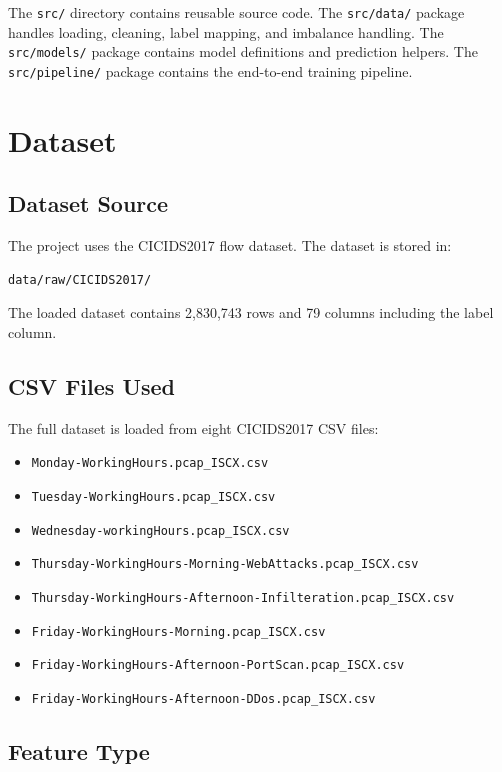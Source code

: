 \documentclass[12pt,a4paper]{article}
\begin{document}
The \texttt{src/} directory contains reusable source code. The \texttt{src/data/} package handles loading, cleaning, label mapping, and imbalance handling. The \texttt{src/models/} package contains model definitions and prediction helpers. The \texttt{src/pipeline/} package contains the end-to-end training pipeline.

\section{Dataset}

\subsection{Dataset Source}

The project uses the CICIDS2017 flow dataset. The dataset is stored in:

\begin{lstlisting}
data/raw/CICIDS2017/
\end{lstlisting}

The loaded dataset contains 2,830,743 rows and 79 columns including the label column.

\subsection{CSV Files Used}

The full dataset is loaded from eight CICIDS2017 CSV files:

\begin{itemize}
    \item \texttt{Monday-WorkingHours.pcap\_ISCX.csv}
    \item \texttt{Tuesday-WorkingHours.pcap\_ISCX.csv}
    \item \texttt{Wednesday-workingHours.pcap\_ISCX.csv}
    \item \texttt{Thursday-WorkingHours-Morning-WebAttacks.pcap\_ISCX.csv}
    \item \texttt{Thursday-WorkingHours-Afternoon-Infilteration.pcap\_ISCX.csv}
    \item \texttt{Friday-WorkingHours-Morning.pcap\_ISCX.csv}
    \item \texttt{Friday-WorkingHours-Afternoon-PortScan.pcap\_ISCX.csv}
    \item \texttt{Friday-WorkingHours-Afternoon-DDos.pcap\_ISCX.csv}
\end{itemize}

\subsection{Feature Type}
\end{document}
